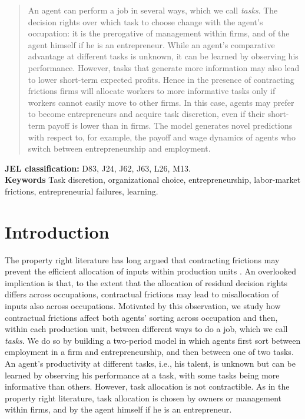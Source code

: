 \documentclass[12pt,american]{paper}
\theoremstyle{remark}
\begin{document}
\begin{abstract}
\singlespacing
An agent can perform a job in several ways, which we call \textit{tasks}.  The decision rights over which task to choose change with the agent's occupation: it is the prerogative of management within firms, and of the agent himself if he is an entrepreneur. While an agent's comparative advantage at different tasks is unknown, it can be learned by observing his performance. However, tasks that generate more information may also lead to lower short-term expected profits. Hence in the presence of contracting frictions firms will allocate workers to more informative tasks only if workers cannot easily move to other firms. In this case, agents may prefer to become entrepreneurs and acquire task discretion, even if their short-term payoff is lower than in firms. The model generates novel predictions with respect to, for example, the payoff and wage dynamics of agents who switch between entrepreneurship and employment.



\end{abstract}
%
\noindent \textbf{JEL classification:} D83, J24, J62, J63, L26, M13.\\
\noindent\textbf{Keywords} Task discretion, organizational choice, entrepreneurship, labor-market frictions, entrepreneurial failures, learning.



\pagebreak
\section{Introduction}
The property right literature  has long argued that contracting frictions may prevent the efficient allocation of inputs within production units \citep{Grossman1986}. An overlooked implication is that, to the extent that the allocation of residual decision rights differs  across occupations,  contractual frictions may  lead to misallocation of inputs also across occupations. Motivated by this observation, we study how contractual frictions affect both agents' sorting across occupation and then, within each production unit, between different ways to do a job, which we call \textit{tasks}.   We do so by building a two-period model in which agents first sort between employment in a firm and entrepreneurship, and then between one of two tasks. An agent's productivity at different tasks, i.e., his talent, is unknown but can be learned by observing his performance at a task, with some tasks being more informative than others. However, task allocation is not contractible. As in the property right literature, task allocation is chosen by owners or management within firms, and by the  agent himself if he is an entrepreneur. 
\end{document}

